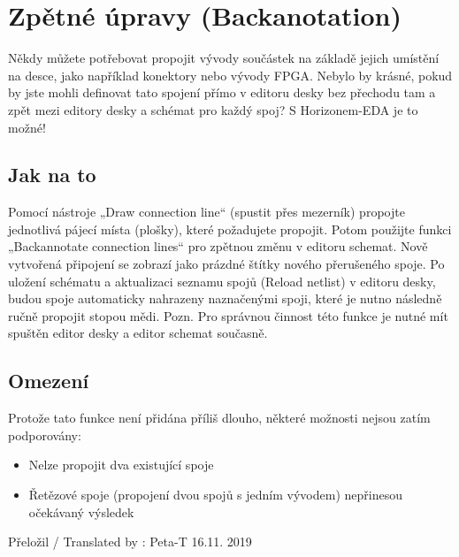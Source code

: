 \documentclass[letterpaper,10pt,czech]{sphinxmanual}
\begin{document}
\chapter{Zpětné úpravy (Backanotation)}
\label{\detokenize{backannotation_cz:zpetne-upravy-backanotation}}\label{\detokenize{backannotation_cz::doc}}
Někdy můžete potřebovat propojit vývody součástek na základě jejich
umístění na desce, jako například konektory nebo vývody FPGA. Nebylo by krásné, pokud by jste mohli definovat tato spojení přímo v editoru desky bez přechodu tam a zpět mezi editory desky a  schémat pro každý spoj? S Horizonem-EDA je to možné!


\section{Jak na to}
\label{\detokenize{backannotation_cz:jak-na-to}}
Pomocí nástroje „Draw connection line“ (spustit přes mezerník) propojte jednotlivá pájecí místa (plošky), které požadujete propojit. Potom použijte funkci „Backannotate connection lines“ pro zpětnou změnu v editoru schemat. Nově vytvořená připojení se zobrazí jako prázdné štítky nového přerušeného spoje. Po uložení schématu a aktualizaci seznamu spojů (Reload netlist) v editoru desky, budou spoje automaticky nahrazeny naznačenými spoji, které je nutno následně ručně propojit stopou mědi. Pozn. Pro správnou činnost této funkce je nutné mít spuštěn editor desky a editor schemat současně.


\section{Omezení}
\label{\detokenize{backannotation_cz:omezeni}}
Protože tato funkce není přidána příliš dlouho, některé možnosti nejsou zatím podporovány:
\begin{itemize}
\item {} 
Nelze propojit dva existující spoje

\item {} 
Řetězové spoje (propojení dvou spojů s jedním vývodem) nepřinesou očekávaný výsledek

\end{itemize}

%
\begin{footnote}[1]\sphinxAtStartFootnote
Přeložil / Translated by : Peta-T 16.11. 2019
%
\end{footnote}



\renewcommand{\indexname}{Rejstřík}
\printindex
\end{document}
